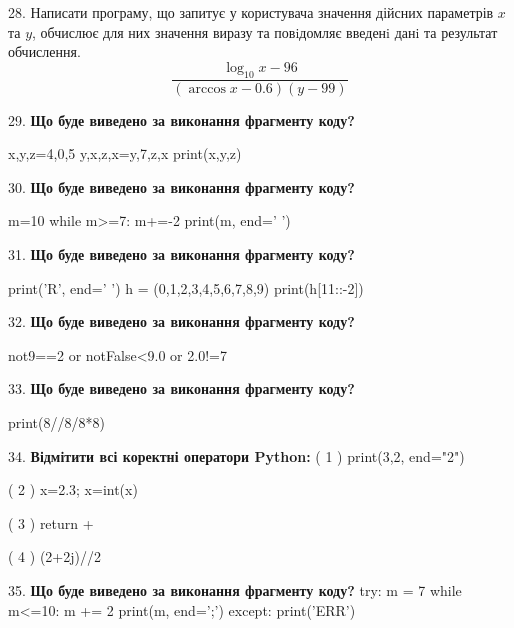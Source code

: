 \documentclass[11pt]{article}
\begin{document}
28. 
Написати програму, що запитує у користувача значення дійсних параметрів $x$ та $y$, обчислює для них значення виразу та повiдомляє введенi данi та результат обчислення.
$$\frac{\log_{10} x - 96}{(\arccos x - 0.6) (y - 99)}$$ 

\par\vspace{5mm}

29. \textbf{Що буде виведено за виконання фрагменту коду?}

x,y,z=4,0,5
y,x,z,x=y,7,z,x
print(x,y,z)
\par\vspace{5mm}

30. \textbf{Що буде виведено за виконання фрагменту коду?}

m=10
while m>=7:
    m+=-2
print(m, end=' ')

\par\vspace{5mm}

31. \textbf{Що буде виведено за виконання фрагменту коду?}

print('R', end=' ')
h = (0,1,2,3,4,5,6,7,8,9)
print(h[11::-2])

\par\vspace{5mm}

32. \textbf{Що буде виведено за виконання фрагменту коду?}

not9==2 or notFalse<9.0 or 2.0!=7
\par\vspace{5mm}

33. \textbf{Що буде виведено за виконання фрагменту коду?}

print(8//8/8*8)
\par\vspace{5mm}

34. %
\textbf{Відмітити всі коректні оператори Python:}
( 1 ) print(3,2, end="2")

( 2 ) x=2.3; x=int(x)

( 3 ) return +

( 4 ) (2+2j)//2
\par\vspace{5mm}

35. \textbf{Що буде виведено за виконання фрагменту коду?}
try:
    m = 7
    while m<=10:
        m += 2
    print(m, end=';')
except:
    print('ERR')
\par\vspace{5mm}
\end{document}
